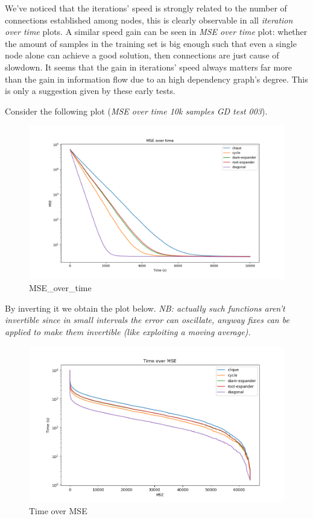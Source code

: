 \documentclass[11pt]{article}
\makeatletter
\def\maxwidth{\ifdim\Gin@nat@width>\linewidth\linewidth
    \else\Gin@nat@width\fi}
\let\Oldincludegraphics\includegraphics
\renewcommand{\includegraphics}[1]{\Oldincludegraphics[width=.8\maxwidth]{#1}}
\makeatother
\begin{document}
We've noticed that the iterations' speed is strongly related to the
number of connections established among nodes, this is clearly
observable in all \emph{iteration over time} plots. A similar speed gain
can be seen in \emph{MSE over time} plot: whether the amount of samples
in the training set is big enough such that even a single node alone can
achieve a good solution, then connections are just cause of slowdown. It
seems that the gain in iterations' speed always matters far more than
the gain in information flow due to an high dependency graph's degree.
This is only a suggestion given by these early tests.

Consider the following plot (\emph{MSE over time 10k samples GD test
003}).

\begin{figure}
\centering
\includegraphics{media/img/tests/test_003_10ksamples_classic/3_mse_time_big.png}
\caption{MSE\_over\_time}
\end{figure}

By inverting it we obtain the plot below. \emph{NB: actually such
functions aren't invertible since in small intervals the error can
oscillate, anyway fixes can be applied to make them invertible (like
exploiting a moving average).}

\begin{figure}
\centering
\includegraphics{media/img/tests/test_003_10ksamples_classic/4_time_mse_big.png}
\caption{Time over MSE}
\end{figure}
\end{document}
